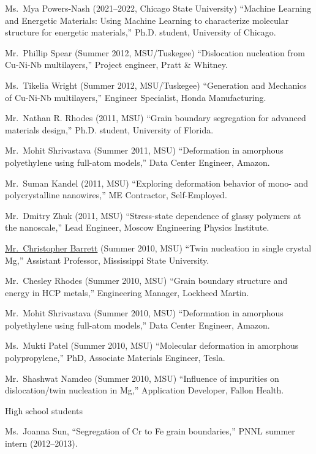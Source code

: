 \begin{list2}
\vspace*{.05in}
\item 
Ms.~Mya Powers-Nash (2021--2022, Chicago State University) ``Machine Learning and Energetic Materials: Using Machine Learning to characterize molecular structure for energetic materials,'' Ph.D. student, University of Chicago.
\item
Mr.~Phillip Spear (Summer 2012, MSU/Tuskegee) ``Dislocation nucleation from Cu-Ni-Nb multilayers,'' Project engineer, Pratt \& Whitney.
\item
Ms.~Tikelia Wright (Summer 2012, MSU/Tuskegee) ``Generation and Mechanics of Cu-Ni-Nb multilayers,'' Engineer Specialist, Honda Manufacturing.
\item
Mr.~Nathan R. Rhodes (2011, MSU) ``Grain boundary segregation for advanced materials design,'' Ph.D. student, University of Florida.
\item
Mr.~Mohit Shrivastava  (Summer 2011, MSU) ``Deformation in amorphous polyethylene using full-atom models,'' Data Center Engineer, Amazon.
\item
Mr.~Suman Kandel (2011, MSU) ``Exploring deformation behavior of mono- and polycrystalline nanowires,'' ME Contractor, Self-Employed.
\item
Mr.~Dmitry Zhuk (2011, MSU) ``Stress-state dependence of glassy polymers at the nanoscale,'' Lead Engineer, Moscow Engineering Physics Institute.
\item
\href{http://scholar.google.com/citations?user=DMtfKn0AAAAJ&hl=en}{Mr.~Christopher Barrett} (Summer 2010, MSU) ``Twin nucleation in single crystal Mg,'' Assistant Professor, Mississippi State University.
\item
Mr.~Chesley Rhodes (Summer 2010, MSU) ``Grain boundary structure and energy in HCP metals,'' Engineering Manager, Lockheed Martin.
\item
Mr.~Mohit Shrivastava  (Summer 2010, MSU) ``Deformation in amorphous polyethylene using full-atom models,'' Data Center Engineer, Amazon.
\item
Ms.~Mukti Patel  (Summer 2010, MSU) ``Molecular deformation in amorphous polypropylene,'' PhD, Associate Materials Engineer, Tesla.
\item
Mr.~Shashwat Namdeo (Summer 2010, MSU) ``Influence of impurities on dislocation/twin nucleation in Mg,'' Application Developer, Fallon Health.
\end{list2}

High school students
\begin{list2}
\vspace*{.05in}
\item
Ms.~Joanna Sun, ``Segregation of Cr to Fe grain boundaries,'' PNNL summer intern (2012--2013).

\end{list2}

